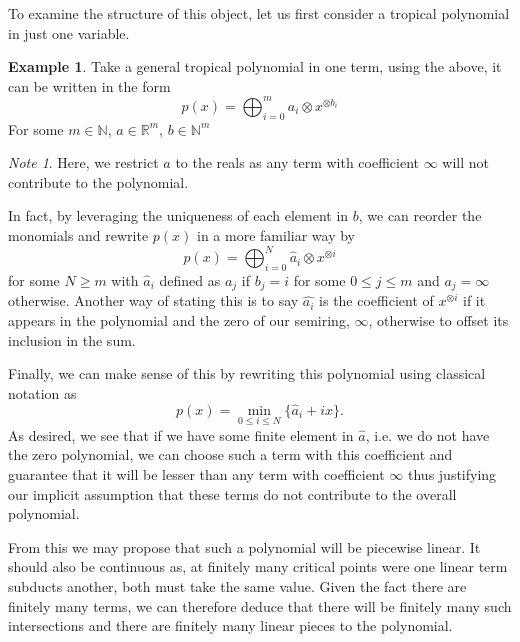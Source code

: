 \documentclass[12pt,a4paper]{amsart}
\newcommand{\N}{\mathbb{N}}
\newcommand{\R}{\mathbb{R}}
\theoremstyle{definition}
\newtheorem{ex}{Example}[section]
\theoremstyle{remark}
\newtheorem*{note}{Note}
\begin{document}
To examine the structure of this object, let us first consider a tropical polynomial in just one variable.
\begin{ex}
Take a general tropical polynomial in one term, using the above, it can be written in the form
\begin{equation}
    p(x) = \bigoplus_{i=0}^m a_i\otimes x^{\otimes b_{i}}
\end{equation}
For some  $m\in\N$, $a\in\R^m$, $b\in \N^m$
\begin{note}
Here, we restrict $a$ to the reals as any term with coefficient $\infty$ will not contribute to the polynomial.
\end{note}
In fact, by leveraging the uniqueness of each element in $b$, we can reorder the monomials and rewrite $p(x)$ in a more familiar way by
\begin{equation}
    p(x) = \bigoplus_{i=0}^N \hat{a}_i\otimes x^{\otimes i}
\end{equation}
for some $N\geq m$ with $\hat{a}_i$ defined as $a_j$ if $b_j = i$ for some $0\leq j\leq m$ and $a_j=\infty$ otherwise. Another way of stating this is to say $\hat{a_i}$ is the coefficient of $x^{\otimes i}$ if it appears in the polynomial and the zero of our semiring, $\infty$, otherwise to offset its inclusion in the sum.

Finally, we can make sense of this by rewriting this polynomial using classical notation as
\begin{equation}
    p(x) = \min_{0\leq i\leq N} \{\hat{a}_i + ix\}.
\end{equation}
As desired, we see that if we have some finite element in $\hat{a}$, i.e. we do not have the zero polynomial, we can choose such a term with this coefficient and guarantee that it will be lesser than any term with coefficient $\infty$ thus justifying our implicit assumption that these terms do not contribute to the overall polynomial.

From this we may propose that such a polynomial will be piecewise linear. It should also be continuous as, at finitely many critical points were one linear term subducts another, both must take the same value. Given the fact there are finitely many terms, we can therefore deduce that there will be finitely many such intersections and there are finitely many linear pieces to the polynomial.

\end{ex}
\end{document}
